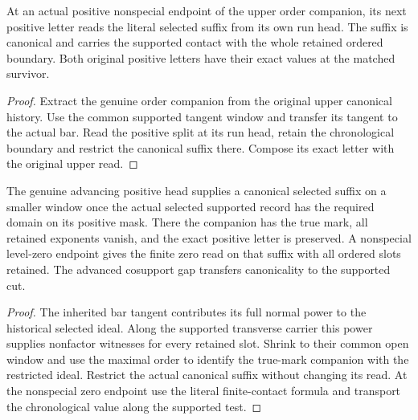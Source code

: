 \begin{theorem}
\label{hir:g1-actual-chronological-next-positive}
\leanok
At an actual positive nonspecial endpoint of the upper
order companion, its next positive letter reads the literal
selected suffix from its own run head. The suffix is canonical
and carries the supported contact with the whole retained
ordered boundary. Both original positive letters have their
exact values at the matched survivor.
\end{theorem}
\begin{proof}
Extract the genuine order companion from the original upper
canonical history. Use the common supported tangent window
and transfer its tangent to the actual bar. Read the positive
split at its run head, retain the chronological boundary
and restrict the canonical suffix there. Compose its exact
letter with the original upper read.
\end{proof}

\begin{theorem}
\label{hir:g1-chronological-true-mark-zero}
\leanok
The genuine advancing positive head supplies a canonical selected
suffix on a smaller window once the actual selected supported record
has the required domain on its positive mask. There the companion has
the true mark, all retained exponents vanish, and the exact positive
letter is preserved. A nonspecial level-zero endpoint gives the
finite zero read on that suffix with all ordered slots retained. The
advanced cosupport gap transfers canonicality to the supported cut.
\end{theorem}
\begin{proof}
The inherited bar tangent contributes its full normal power to the
historical selected ideal. Along the supported transverse carrier
this power supplies nonfactor witnesses for every retained slot.
Shrink to their common open window and use the maximal order to
identify the true-mark companion with the restricted ideal. Restrict
the actual canonical suffix without changing its read. At the
nonspecial zero endpoint use the literal finite-contact formula and
transport the chronological value along the supported test.
\end{proof}

